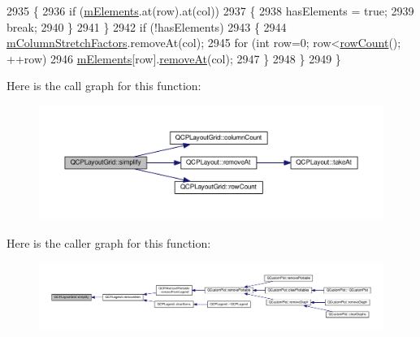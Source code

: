 \begin{DoxyCode}
2935     \{
2936       \textcolor{keywordflow}{if} (\hyperlink{class_q_c_p_layout_grid_a3577d3855bf8ad20ef9079291a49f397}{mElements}.at(row).at(col))
2937       \{
2938         hasElements = \textcolor{keyword}{true};
2939         \textcolor{keywordflow}{break};
2940       \}
2941     \}
2942     \textcolor{keywordflow}{if} (!hasElements)
2943     \{
2944       \hyperlink{class_q_c_p_layout_grid_ac6aabe62339f94f18b9f8adab94b1840}{mColumnStretchFactors}.removeAt(col);
2945       \textcolor{keywordflow}{for} (\textcolor{keywordtype}{int} row=0; row<\hyperlink{class_q_c_p_layout_grid_af8e6c7a05864ebe610c87756c7b9079c}{rowCount}(); ++row)
2946         \hyperlink{class_q_c_p_layout_grid_a3577d3855bf8ad20ef9079291a49f397}{mElements}[row].\hyperlink{class_q_c_p_layout_a2403f684fee3ce47132faaeed00bb066}{removeAt}(col);
2947     \}
2948   \}
2949 \}
\end{DoxyCode}


Here is the call graph for this function\+:\nopagebreak
\begin{figure}[H]
\begin{center}
\leavevmode
\includegraphics[width=350pt]{class_q_c_p_layout_grid_a08bba60e4acd20165526a8fd7f986b58_cgraph}
\end{center}
\end{figure}




Here is the caller graph for this function\+:\nopagebreak
\begin{figure}[H]
\begin{center}
\leavevmode
\includegraphics[width=350pt]{class_q_c_p_layout_grid_a08bba60e4acd20165526a8fd7f986b58_icgraph}
\end{center}
\end{figure}


\hypertarget{class_q_c_p_layout_grid_a666a9fe9e92054436f9b66eba25cca0c}{}
